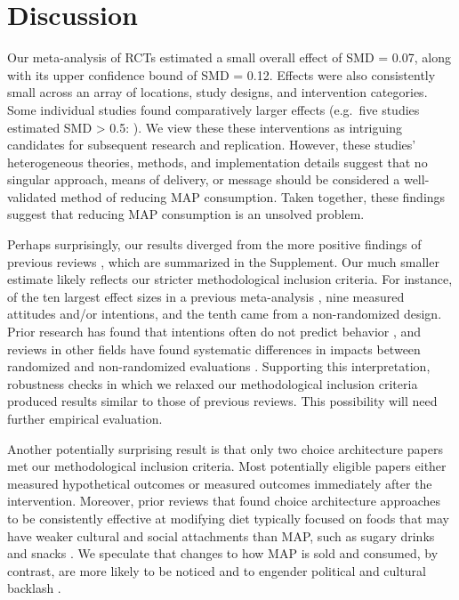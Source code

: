 \documentclass[sn-nature,referee,lineno,pdflatex]{sn-jnl}
\begin{document}
\section{Discussion}\label{discussion}

Our meta-analysis of RCTs estimated a small overall effect of SMD =
0.07, along with its upper confidence bound of SMD = 0.12. Effects were
also consistently small across an array of locations, study designs, and
intervention categories. Some individual studies found comparatively
larger effects (e.g.~five studies estimated SMD \textgreater{} 0.5:
\citep{carfora2023, merrill2009, kanchanachitra2020, bianchi2022, piester2020}).
We view these these interventions as intriguing candidates for
subsequent research and replication. However, these studies'
heterogeneous theories, methods, and implementation details suggest that
no singular approach, means of delivery, or message should be considered
a well-validated method of reducing MAP consumption. Taken together,
these findings suggest that reducing MAP consumption is an unsolved
problem.

Perhaps surprisingly, our results diverged from the more positive
findings of previous reviews
\citep{mathur2021meta, meier2022, mertens2022}, which are summarized in
the Supplement. Our much smaller estimate likely reflects our stricter
methodological inclusion criteria. For instance, of the ten largest
effect sizes in a previous meta-analysis
\citep{mathur2021effectiveness}, nine measured attitudes and/or
intentions, and the tenth came from a non-randomized design. Prior
research has found that intentions often do not predict behavior
\citep{mathur2021effectiveness}, and reviews in other fields have found
systematic differences in impacts between randomized and non-randomized
evaluations \citep{porat2024, stevenson2023}. Supporting this
interpretation, robustness checks in which we relaxed our methodological
inclusion criteria produced results similar to those of previous
reviews. This possibility will need further empirical evaluation.

Another potentially surprising result is that only two choice
architecture papers met our methodological inclusion criteria. Most
potentially eligible papers either measured hypothetical outcomes or
measured outcomes immediately after the intervention. Moreover, prior
reviews that found choice architecture approaches to be consistently
effective at modifying diet typically focused on foods that may have
weaker cultural and social attachments than MAP, such as sugary drinks
and snacks \citep{venema2020, adriaanse2009}. We speculate that changes
to how MAP is sold and consumed, by contrast, are more likely to be
noticed and to engender political and cultural backlash
\citep{popper2019}.
\end{document}
